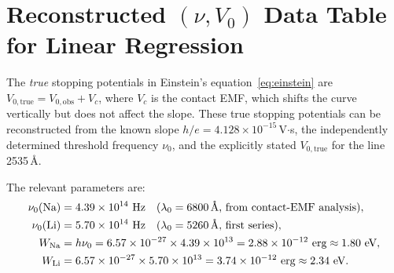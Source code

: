 \documentclass[12pt]{article}
\begin{document}
\section{Reconstructed \texorpdfstring{$(\nu, V_0)$}{(nu, V0)}
         Data Table for Linear Regression}

The \emph{true} stopping potentials in Einstein's equation~\eqref{eq:einstein}
are $V_{0,\text{true}} = V_{0,\text{obs}} + V_c$, where $V_c$ is the contact
EMF, which shifts the curve vertically but does not affect the slope.
These true stopping potentials can be reconstructed from the known
slope $h/e = 4.128\times10^{-15}$\,V$\cdot$s, the independently
determined threshold frequency $\nu_0$, and the explicitly stated
$V_{0,\text{true}}$ for the line 2535\,\AA.

The relevant parameters are:
\begin{align*}
  \nu_0(\text{Na}) &= 4.39\times10^{14}\text{ Hz}
    \quad (\lambda_0 = 6800\text{\,\AA, from contact-EMF analysis}), \\
  \nu_0(\text{Li}) &= 5.70\times10^{14}\text{ Hz}
    \quad (\lambda_0 = 5260\text{\,\AA, first series}), \\
  W_{\text{Na}} &= h\nu_0 = 6.57\times10^{-27}\times4.39\times10^{13}
                 = 2.88\times10^{-12}\text{ erg} \approx 1.80\text{ eV}, \\
  W_{\text{Li}} &= 6.57\times10^{-27}\times5.70\times10^{13}
                 = 3.74\times10^{-12}\text{ erg} \approx 2.34\text{ eV}.
\end{align*}
\end{document}
